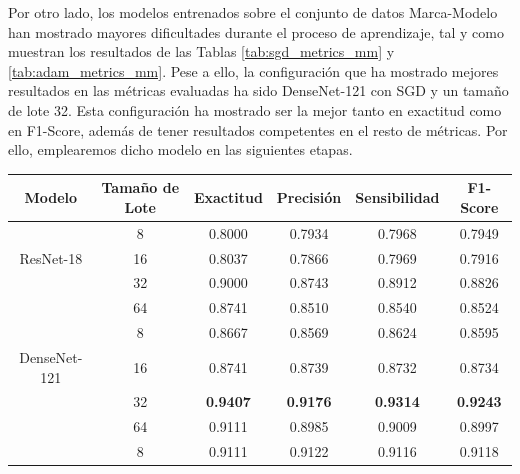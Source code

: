 Por otro lado, los modelos entrenados sobre el conjunto de datos Marca-Modelo han
mostrado mayores dificultades durante el proceso de aprendizaje, tal y como
muestran los resultados de las Tablas \ref{tab:sgd_metrics_mm} y
\ref{tab:adam_metrics_mm}. Pese a ello, la configuración que ha mostrado mejores
resultados en las métricas evaluadas ha sido DenseNet-121 con SGD y un tamaño de
lote 32. Esta configuración ha mostrado ser la mejor tanto en exactitud como en
F1-Score, además de tener resultados competentes en el resto de métricas. Por
ello, emplearemos dicho modelo en las siguientes etapas.

\begin{table}[H]
	\centering
	\begin{adjustbox}
		{width=\textwidth}
		\begin{tabular}{|c|c|c|c|c|c|}
			\hline
			\textbf{Modelo}             & \textbf{Tamaño de Lote} & \textbf{Exactitud} & \textbf{Precisión} & \textbf{Sensibilidad} & \textbf{F1-Score} \\
			\hline
			& 8                       & 0.8000             & 0.7934             & 0.7968                & 0.7949            \\
			\cline{2-6} ResNet-18       & 16                      & 0.8037             & 0.7866             & 0.7969                & 0.7916            \\
			\cline{2-6}                 & 32                      & 0.9000             & 0.8743             & 0.8912                & 0.8826            \\
			\cline{2-6}                 & 64                      & 0.8741             & 0.8510             & 0.8540                & 0.8524            \\
			\hline
			& 8                       & 0.8667             & 0.8569             & 0.8624                & 0.8595            \\
			\cline{2-6} DenseNet-121    & 16                      & 0.8741             & 0.8739             & 0.8732                & 0.8734            \\
			\cline{2-6}                 & 32                      & \textbf{0.9407}    & \textbf{0.9176}    & \textbf{0.9314}       & \textbf{0.9243}   \\
			\cline{2-6}                 & 64                      & 0.9111             & 0.8985             & 0.9009                & 0.8997            \\
			\hline
			& 8                       & 0.9111             & 0.9122             & 0.9116                & 0.9118            \\

\end{tabular}
\end{adjustbox}
\end{table}
